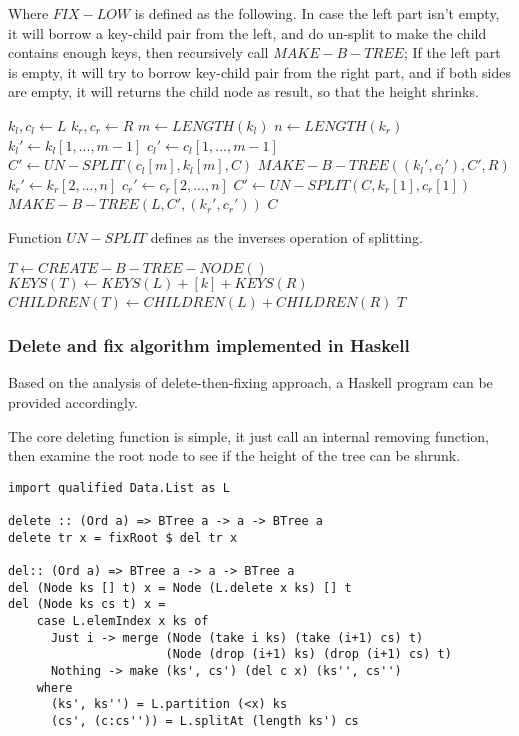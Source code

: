 \documentclass{article}
\begin{document}
Where $FIX-LOW$ is defined as the following. In case the left part
isn't empty, it will borrow a key-child pair from the left, and
do un-split to make the child contains enough keys, then recursively
call $MAKE-B-TREE$; If the left part is empty, it will try to borrow
key-child pair from the right part, and if both sides are empty, it
will returns the child node as result, so that the height shrinks.

\begin{algorithmic}[1]
  \State $k_l, c_l \gets L$
  \State $k_r, c_r \gets R$
  \State $m \gets LENGTH(k_l)$
  \State $n \gets LENGTH(k_r)$
    \State $k_l' \gets k_l[1, ..., m-1]$
    \State $c_l' \gets c_l[1, ..., m-1]$
    \State $C' \gets UN-SPLIT(c_l[m], k_l[m], C)$
    \State \Return $MAKE-B-TREE((k_l', c_l'), C', R)$
    \State $k_r' \gets k_r[2, ..., n]$
    \State $c_r' \gets c_r[2, ..., n]$
    \State $C' \gets UN-SPLIT(C, k_r[1], c_r[1])$
    \State \Return $MAKE-B-TREE(L, C', (k_r', c_r'))$
  \Else
    \State \Return $C$
  \EndIf
\EndFunction
\end{algorithmic}

Function $UN-SPLIT$ defines as the inverses operation of splitting.

\begin{algorithmic}[1]
  \State $T \gets CREATE-B-TREE-NODE()$
  \State $KEYS(T) \gets KEYS(L)+[k]+KEYS(R)$
  \State $CHILDREN(T) \gets CHILDREN(L)+CHILDREN(R)$
  \State \Return $T$
\EndFunction
\end{algorithmic}

\subsubsection{Delete and fix algorithm implemented in Haskell}
Based on the analysis of delete-then-fixing approach, a Haskell
program can be provided accordingly.

The core deleting function is simple, it just call an internal
removing function, then examine the root node to see if the
height of the tree can be shrunk.

\lstset{language=Haskell}
\begin{lstlisting}
import qualified Data.List as L

delete :: (Ord a) => BTree a -> a -> BTree a
delete tr x = fixRoot $ del tr x

del:: (Ord a) => BTree a -> a -> BTree a
del (Node ks [] t) x = Node (L.delete x ks) [] t
del (Node ks cs t) x =
    case L.elemIndex x ks of
      Just i -> merge (Node (take i ks) (take (i+1) cs) t)
                      (Node (drop (i+1) ks) (drop (i+1) cs) t)
      Nothing -> make (ks', cs') (del c x) (ks'', cs'')
    where
      (ks', ks'') = L.partition (<x) ks
      (cs', (c:cs'')) = L.splitAt (length ks') cs
\end{lstlisting} %
\end{document}
